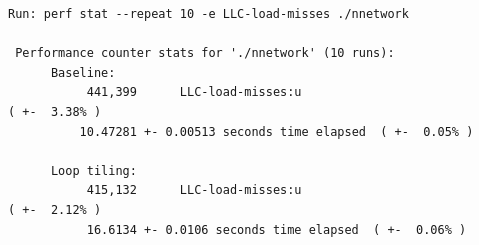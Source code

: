 \documentclass[a4paper, DIV12, headsepline]{scrartcl}
\begin{document}
\begin{enumerate}[label=\alph*)]
\begin{verbatim}  
Run: perf stat --repeat 10 -e LLC-load-misses ./nnetwork

 Performance counter stats for './nnetwork' (10 runs):
      Baseline:
           441,399      LLC-load-misses:u                                             ( +-  3.38% )
          10.47281 +- 0.00513 seconds time elapsed  ( +-  0.05% )

      Loop tiling:
           415,132      LLC-load-misses:u                                             ( +-  2.12% )
           16.6134 +- 0.0106 seconds time elapsed  ( +-  0.06% )
\end{verbatim}

\end{enumerate}
%
%
%
\end{document}

